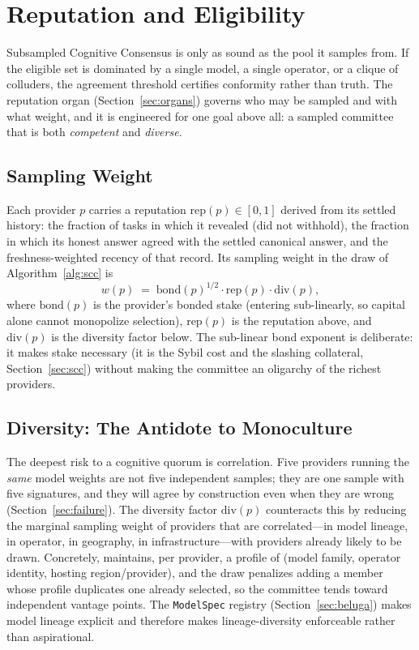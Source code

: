\section{Reputation and Eligibility}
\label{sec:reputation}

Subsampled Cognitive Consensus is only as sound as the pool it samples from. If the eligible set is dominated by a single model, a single operator, or a clique of colluders, the agreement threshold certifies conformity rather than truth. The reputation organ \RChain{} (Section~\ref{sec:organs}) governs who may be sampled and with what weight, and it is engineered for one goal above all: a sampled committee that is both \emph{competent} and \emph{diverse}.

\subsection{Sampling Weight}

Each provider $p$ carries a reputation $\mathrm{rep}(p) \in [0,1]$ derived from its settled history: the fraction of tasks in which it revealed (did not withhold), the fraction in which its honest answer agreed with the settled canonical answer, and the freshness-weighted recency of that record. Its sampling weight in the draw of Algorithm~\ref{alg:scc} is
\begin{equation}
\label{eq:weight}
w(p) \;=\; \mathrm{bond}(p)^{1/2}\cdot \mathrm{rep}(p)\cdot \mathrm{div}(p),
\end{equation}
where $\mathrm{bond}(p)$ is the provider's bonded stake (entering sub-linearly, so capital alone cannot monopolize selection), $\mathrm{rep}(p)$ is the reputation above, and $\mathrm{div}(p)$ is the diversity factor below. The sub-linear bond exponent is deliberate: it makes stake necessary (it is the Sybil cost and the slashing collateral, Section~\ref{sec:scc}) without making the committee an oligarchy of the richest providers.

\subsection{Diversity: The Antidote to Monoculture}

The deepest risk to a cognitive quorum is correlation. Five providers running the \emph{same} model weights are not five independent samples; they are one sample with five signatures, and they will agree by construction even when they are wrong (Section~\ref{sec:failure}). The diversity factor $\mathrm{div}(p)$ counteracts this by reducing the marginal sampling weight of providers that are correlated---in model lineage, in operator, in geography, in infrastructure---with providers already likely to be drawn. Concretely, \RChain{} maintains, per provider, a profile of (model family, operator identity, hosting region/provider), and the draw penalizes adding a member whose profile duplicates one already selected, so the committee tends toward independent vantage points. The \texttt{ModelSpec} registry (Section~\ref{sec:beluga}) makes model lineage explicit and therefore makes lineage-diversity enforceable rather than aspirational.

